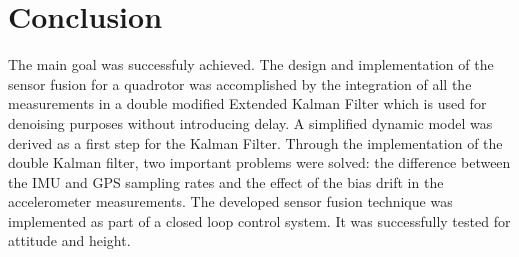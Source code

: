 \documentclass[conference]{IEEEtran}
\begin{document}



\section{Conclusion}
\balance

The main goal was successfuly achieved. The design and implementation of the sensor fusion for a quadrotor was accomplished by the integration of all the measurements in a double modified Extended Kalman Filter which is used for denoising purposes without introducing delay. A simplified dynamic model was derived as a first step for the Kalman Filter. Through the implementation of the double Kalman filter, two important problems were solved: the difference between the IMU and GPS sampling rates and the effect of the bias drift in the accelerometer measurements. The developed sensor fusion technique was implemented as part of a closed loop control system. It was successfully tested for attitude and height. 
 




\end{document}
